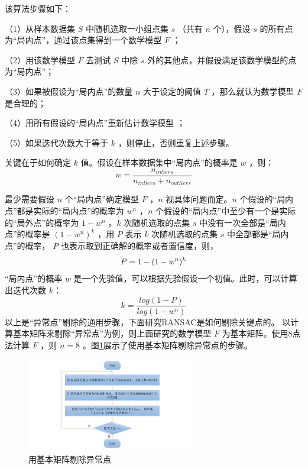 该算法步骤如下：

（1）从样本数据集 $S$ 中随机选取一小组点集 $s$ （共有 $n$ 个），假设 $s$  的所有点为“局内点”，通过该点集得到一个数学模型 $F$ ；

（2）用该数学模型 $F$ 去测试 $S$ 中除 $s$ 外的其他点，并假设满足该数学模型的点为“局内点”；

（3）如果被假设为“局内点”的数量 $n$ 大于设定的阈值 $T$ ，那么就认为数学模型 $F$ 是合理的；

（4）用所有假设的“局内点”重新估计数学模型 ；

（5）如果迭代次数大于等于 $k$ ，则停止，否则重复上述步骤。

关键在于如何确定 $k$ 值。假设在样本数据集中“局内点”的概率是 $w $ ，则：
\begin{equation}
\label{eqn:3.10}
w = \frac{n_{inliers}}{n_{inliers} + n_{outliers}}
\end{equation}

最少需要假设 $n$ 个“局内点”确定模型 $F$ ，$n$ 视具体问题而定。$n$ 个假设的“局内点”都是实际的“局内点”的概率为 $w^n$ ，$n$ 个假设的“局内点”中至少有一个是实际的“局外点”的概率为 $1-w^n $ 。$k$ 次随机选取的点集 $s$ 中没有一次全部是“局内点”的概率是 $(1-w^n)^k $ ，用  $P$ 表示 $k$ 次随机选取的点集 $s$  中全部都是“局内点”的概率， $P$ 也表示取到正确解的概率或者置信度，则，
\begin{equation}
\label{eqn:3.11}
\setlength{\abovedisplayskip}{6pt}
\setlength{\belowdisplayskip}{6pt}
P=1-(1-w^n)^k
\end{equation}
“局内点”的概率 $w$  是一个先验值，可以根据先验假设一个初值。此时，可以计算出迭代次数 $k$：
\begin{equation}
\label{eqn:3.12}
k = \frac{log(1-P)}{log(1-w^n)}
\end{equation}
以上是“异常点”剔除的通用步骤，下面研究RANSAC是如何剔除关键点的。
以计算基本矩阵来剔除“异常点”为例，则上面研究的数学模型 $F$ 为基本矩阵。使用8点法计算 $F $ ，则 $n=8$ 。图\ref{fig3_5}展示了使用基本矩阵剔除异常点的步骤。
\begin{figure}[h]\setlength{\belowcaptionskip}{-12pt}
	\centering
	\includegraphics[width=0.65\textwidth]{figures/chapter3/fig3_5}
	\caption{用基本矩阵剔除异常点}\label{fig3_5}
\end{figure}

